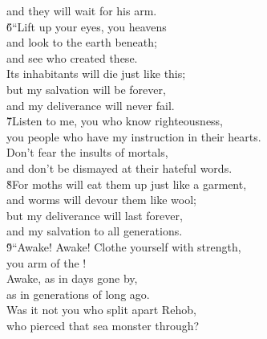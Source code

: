\begin{poetry}
\poemlll       and they will wait for his arm. \\
\poeml \v{6}``Lift up your eyes, you heavens \\
\poemll    and look to the earth beneath; \\
\poemlll       and see who created these. \\
\poeml Its inhabitants will die just like this; \\
\poemll    but my salvation will be forever, \\
\poemlll       and my deliverance will never fail. \\
\poeml \v{7}Listen to me, you who know righteousness, \\
\poemll    you people who have my instruction in their hearts. \\
\poeml Don't fear the insults of mortals, \\
\poemll    and don't be dismayed at their hateful words. \\
\poeml \v{8}For moths will eat them up just like a garment, \\
\poemll    and worms will devour them like wool; \\
\poeml but my deliverance will last forever, \\
\poemll    and my salvation to all generations. \\
\poeml \v{9}``Awake! Awake! Clothe yourself with strength, \\
\poemll    you arm of the ! \\
\poeml Awake, as in days gone by, \\
\poemll    as in generations of long ago. \\
\poeml Was it not you who split apart Rehob, \\
\poemll    who pierced that sea monster through? \\

\end{poetry}
